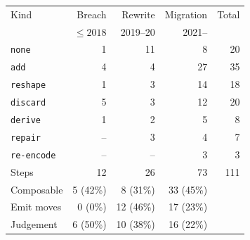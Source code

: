\begin{tabular}{@{}lrrrr@{}}
\toprule
Kind & Breach & Rewrite & Migration & Total \\
 & \footnotesize ${\le}2018$ & \footnotesize 2019--20 & \footnotesize 2021-- & \\
\midrule
\texttt{none} & 1 & 11 & 8 & 20 \\
\texttt{add} & 4 & 4 & 27 & 35 \\
\texttt{reshape} & 1 & 3 & 14 & 18 \\
\texttt{discard} & 5 & 3 & 12 & 20 \\
\texttt{derive} & 1 & 2 & 5 & 8 \\
\texttt{repair} & -- & 3 & 4 & 7 \\
\texttt{re-encode} & -- & -- & 3 & 3 \\
\midrule
Steps & 12 & 26 & 73 & 111 \\
Composable & 5 (42\%) & 8 (31\%) & 33 (45\%) & \\
Emit moves & 0 (0\%) & 12 (46\%) & 17 (23\%) & \\
Judgement & 6 (50\%) & 10 (38\%) & 16 (22\%) & \\
\bottomrule
\end{tabular}
